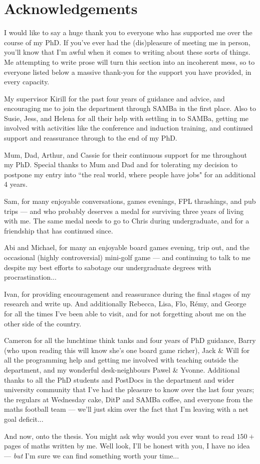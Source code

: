 \chapter*{Acknowledgements}
I would like to say a huge thank you to everyone who has supported me over the course of my PhD.
If you've ever had the (dis)pleasure of meeting me in person, you'll know that I'm awful when it comes to writing about these sorts of things.
Me attempting to write prose will turn this section into an incoherent mess, so to everyone listed below a massive thank-you for the support you have provided, in every capacity.

My supervisor Kirill for the past four years of guidance and advice, and encouraging me to join the department through SAMBa in the first place.
Also to Susie, Jess, and Helena for all their help with settling in to SAMBa, getting me involved with activities like the conference and induction training, and continued support and reassurance through to the end of my PhD.

Mum, Dad, Arthur, and Cassie for their continuous support for me throughout my PhD.
Special thanks to Mum and Dad and for tolerating my decision to postpone my entry into ``the real world, where people have jobs" for an additional 4 years.

Sam, for many enjoyable conversations, games evenings, FPL thrashings, and pub trips --- and who probably deserves a medal for surviving three years of living with me. 
The same medal needs to go to Chris during undergraduate, and for a friendship that has continued since.

Abi and Michael, for many an enjoyable board games evening, trip out, and the occasional (highly controversial) mini-golf game --- and continuing to talk to me despite my best efforts to sabotage our undergraduate degrees with procrastination...

Ivan, for providing encouragement and reassurance during the final stages of my research and write up. 
And additionally Rebecca, Lisa, Flo, R\'{e}my, and George for all the times I've been able to visit, and for not forgetting about me on the other side of the country.

Cameron for all the lunchtime think tanks and four years of PhD guidance, Barry (who upon reading this will know she's one board game richer), Jack \& Will for all the programming help and getting me involved with teaching outside the department, and my wonderful desk-neighbours Pawel \& Yvonne.
Additional thanks to all the PhD students and PostDocs in the department and wider university community that I've had the pleasure to know over the last four years; the regulars at Wednesday cake, DitP and SAMBa coffee, and everyone from the maths football team --- we'll just skim over the fact that I'm leaving with a net goal deficit... 

And now, onto the thesis.
You might ask why would you ever want to read $150+$ pages of maths written by me.
Well look, I'll be honest with you, I have no idea --- \emph{but} I'm sure we can find something worth your time...